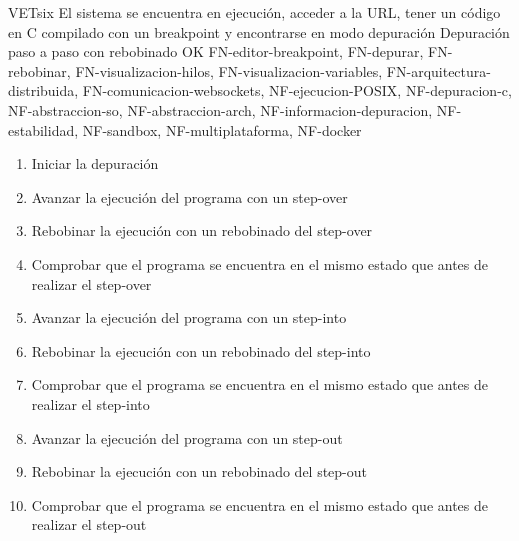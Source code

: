     \begin{testCase}{VET}{six}
        {El sistema se encuentra en ejecución, acceder a la URL, tener un código en C compilado con un breakpoint y encontrarse en modo depuración}
        {\NA}
        {Depuración paso a paso con rebobinado}
        {OK}
        {FN-editor-breakpoint, FN-depurar, FN-rebobinar, FN-visualizacion-hilos, FN-visualizacion-variables, FN-arquitectura-distribuida, FN-comunicacion-websockets, NF-ejecucion-POSIX, NF-depuracion-c, NF-abstraccion-so, NF-abstraccion-arch, NF-informacion-depuracion, NF-estabilidad, NF-sandbox, NF-multiplataforma, NF-docker}
        \begin{enumerate}
            \item Iniciar la depuración
            \item Avanzar la ejecución del programa con un step-over
            \item Rebobinar la ejecución con un rebobinado del step-over
            \item Comprobar que el programa se encuentra en el mismo estado que antes de realizar el step-over
            \item Avanzar la ejecución del programa con un step-into
            \item Rebobinar la ejecución con un rebobinado del step-into
            \item Comprobar que el programa se encuentra en el mismo estado que antes de realizar el step-into
            \item Avanzar la ejecución del programa con un step-out
            \item Rebobinar la ejecución con un rebobinado del step-out
            \item Comprobar que el programa se encuentra en el mismo estado que antes de realizar el step-out
        \end{enumerate}
    \end{testCase}
    
